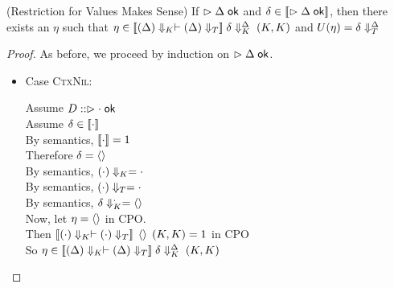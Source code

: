 \begin{lemma}{(Restriction for Values Makes Sense)}
If $\vartriangleright {\Delta} \;\mathsf{ok}$ and $\delta \in [\![{\vartriangleright {\Delta} \;\mathsf{ok}}]\!]$, 
then there exists an $\eta$ such that 
$\eta \in [\![{({\Delta})\Downarrow_K \vdash ({\Delta})\Downarrow_T}]\!]\;
            {\delta}\Downarrow^{\Delta}_K\;
            (K,K)$ and $U(\eta) = {\delta}\Downarrow^{\Delta}_T$
\end{lemma}

\begin{proof}
As before, we proceed by induction on $\vartriangleright {\Delta} \;\mathsf{ok}$. 
\begin{itemize}
\item Case \textsc{CtxNil}: 
  \begin{tabbedproof}
    \oo Assume $D :: \vartriangleright {\cdot} \;\mathsf{ok}$ \\
    \oo Assume $\delta \in [\![{\cdot}]\!]$ \\
    \ooo By semantics, $[\![{\cdot}]\!] = 1$ \\
    \ooo Therefore $\delta = \left<\right>$ \\
    \ooo By semantics, $({\cdot})\Downarrow_K = \cdot$ \\
    \ooo By semantics, $({\cdot})\Downarrow_T = \cdot$ \\
    \ooo By semantics, ${\delta}\Downarrow^{\cdot}_K = \left<\right>$ \\
    \ooo Now, let $\eta = \left<\right>$ in CPO. \\
    \ooo Then $[\![{({\cdot})\Downarrow_K \vdash ({\cdot})\Downarrow_T}]\!]\;\left<\right>\;(K,K) = 1$ in CPO \\
    \ooo So $\eta \in [\![{({\Delta})\Downarrow_K \vdash ({\Delta})\Downarrow_T}]\!]\;
            {\delta}\Downarrow^{\Delta}_K\;
            (K,K)$ \\
  \end{tabbedproof}


\end{itemize}
\end{proof}
